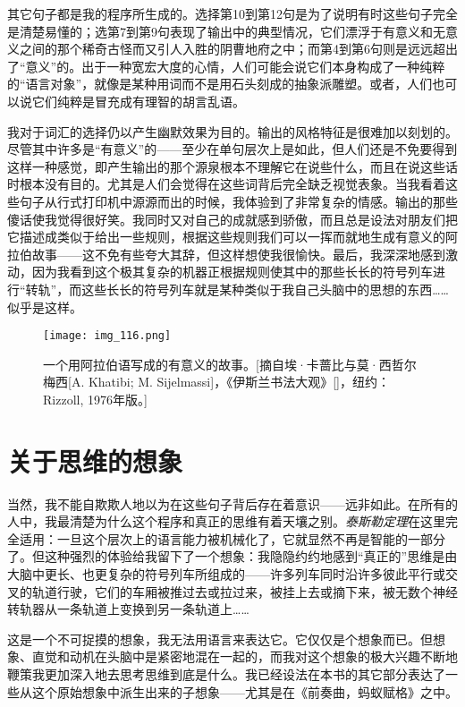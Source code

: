 其它句子都是我的程序所生成的。选择第10到第12句是为了说明有时这些句子完全是清楚易懂的；选第7到第9句表现了输出中的典型情况，它们漂浮于有意义和无意义之间的那个稀奇古怪而又引人入胜的阴曹地府之中；而第4到第6句则是远远超出了“意义”的。出于一种宽宏大度的心情，人们可能会说它们本身构成了一种纯粹的“语言对象”，就像是某种用词而不是用石头刻成的抽象派雕塑。或者，人们也可以说它们纯粹是冒充成有理智的胡言乱语。

我对于词汇的选择仍以产生幽默效果为目的。输出的风格特征是很难加以刻划的。尽管其中许多是“有意义”的——至少在单句层次上是如此，但人们还是不免要得到这样一种感觉，即产生输出的那个源泉根本不理解它在说些什么，而且在说这些话时根本没有目的。尤其是人们会觉得在这些词背后完全缺乏视觉表象。当我看着这些句子从行式打印机中源源而出的时候，我体验到了非常复杂的情感。输出的那些傻话使我觉得很好笑。我同时又对自己的成就感到骄傲，而且总是设法对朋友们把它描述成类似于给出一些规则，根据这些规则我们可以一挥而就地生成有意义的阿拉伯故事——这不免有些夸大其辞，但这样想使我很愉快。最后，我深深地感到激动，因为我看到这个极其复杂的机器正根据规则使其中的那些长长的符号列车进行“转轨”，而这些长长的符号列车就是某种类似于我自己头脑中的思想的东西……似乎是这样。

\begin{figure}
\texttt{[image: img\_116.png]}
\caption[一个用阿拉伯语写成的有意义的故事。]
  {一个用阿拉伯语写成的有意义的故事。[摘自埃·卡蔷比与莫·西哲尔梅西[A. Khatibi; M. Sijelmassi]，《伊斯兰书法大观》[]，纽约：Rizzoll, 1976年版。]}
\end{figure}

\section{关于思维的想象}

当然，我不能自欺欺人地以为在这些句子背后存在着意识——远非如此。在所有的人中，我最清楚为什么这个程序和真正的思维有着天壤之别。\emph{泰斯勒定理}在这里完全适用：一旦这个层次上的语言能力被机械化了，它就显然不再是智能的一部分了。但这种强烈的体验给我留下了一个想象：我隐隐约约地感到“真正的”思维是由大脑中更长、也更复杂的符号列车所组成的——许多列车同时沿许多彼此平行或交叉的轨道行驶，它们的车厢被推过去或拉过来，被挂上去或摘下来，被无数个神经转轨器从一条轨道上变换到另一条轨道上……

这是一个不可捉摸的想象，我无法用语言来表达它。它仅仅是个想象而已。但想象、直觉和动机在头脑中是紧密地混在一起的，而我对这个想象的极大兴趣不断地鞭策我更加深入地去思考思维到底是什么。我已经设法在本书的其它部分表达了一些从这个原始想象中派生出来的子想象——尤其是在《前奏曲，蚂蚁赋格》之中。

